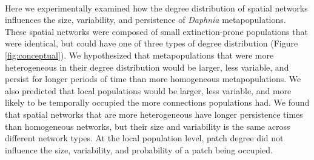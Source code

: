 

\paragraph*{}
Here we experimentally examined how the degree distribution of spatial networks influences the size, variability, and persistence of \textit{Daphnia} metapopulations. These spatial networks were composed of  small extinction-prone populations that were identical, but could have one of three types of degree distribution (Figure \ref{fig:conceptual}). We hypothesized that metapopulations that were more heterogeneous in their degree distribution would be larger, less variable, and persist for longer periods of time than more homogeneous metapopulations. We also predicted that local populations would be larger, less variable, and more likely to be temporally occupied the more connections populations had. We found that spatial networks that are more heterogeneous have longer persistence times than homogeneous networks, but their size and variability is the same across different network types. At the local population level, patch degree did not influence the size, variability, and probability of a patch being occupied. 




